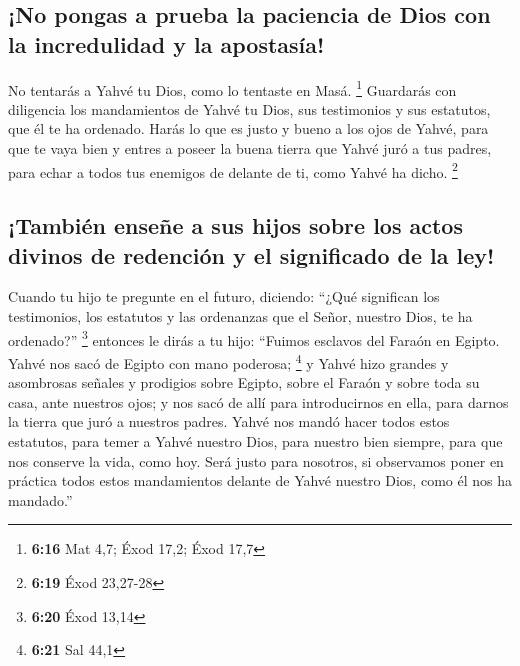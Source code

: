 \begin{paracol}{2}
\hypertarget{no-pongas-a-prueba-la-paciencia-de-dios-con-la-incredulidad-y-la-apostasuxeda}{%
\subsection{¡No pongas a prueba la paciencia de Dios con la incredulidad
y la
apostasía!}\label{no-pongas-a-prueba-la-paciencia-de-dios-con-la-incredulidad-y-la-apostasuxeda}}

 No tentarás a Yahvé tu Dios, como lo tentaste en Masá.
\footnote{\textbf{6:16} Mat 4,7; Éxod 17,2; Éxod 17,7} 
Guardarás con diligencia los mandamientos de Yahvé tu Dios, sus
testimonios y sus estatutos, que él te ha ordenado. 
Harás lo que es justo y bueno a los ojos de Yahvé, para que te vaya bien
y entres a poseer la buena tierra que Yahvé juró a tus padres,
 para echar a todos tus enemigos de delante de ti, como
Yahvé ha dicho. \footnote{\textbf{6:19} Éxod 23,27-28}

\hypertarget{tambiuxe9n-enseuxf1e-a-sus-hijos-sobre-los-actos-divinos-de-redenciuxf3n-y-el-significado-de-la-ley}{%
\subsection{¡También enseñe a sus hijos sobre los actos divinos de
redención y el significado de la
ley!}\label{tambiuxe9n-enseuxf1e-a-sus-hijos-sobre-los-actos-divinos-de-redenciuxf3n-y-el-significado-de-la-ley}}

 Cuando tu hijo te pregunte en el futuro, diciendo:
``¿Qué significan los testimonios, los estatutos y las ordenanzas que el
Señor, nuestro Dios, te ha ordenado?'' \footnote{\textbf{6:20} Éxod
  13,14}  entonces le dirás a tu hijo: ``Fuimos esclavos
del Faraón en Egipto. Yahvé nos sacó de Egipto con mano poderosa;
\footnote{\textbf{6:21} Sal 44,1}  y Yahvé hizo grandes y
asombrosas señales y prodigios sobre Egipto, sobre el Faraón y sobre
toda su casa, ante nuestros ojos;  y nos sacó de allí
para introducirnos en ella, para darnos la tierra que juró a nuestros
padres.  Yahvé nos mandó hacer todos estos estatutos,
para temer a Yahvé nuestro Dios, para nuestro bien siempre, para que nos
conserve la vida, como hoy.  Será justo para nosotros, si
observamos poner en práctica todos estos mandamientos delante de Yahvé
nuestro Dios, como él nos ha mandado.''

\switchcolumn
\begin{otherlanguage}{english}


\end{otherlanguage}
\end{paracol}
